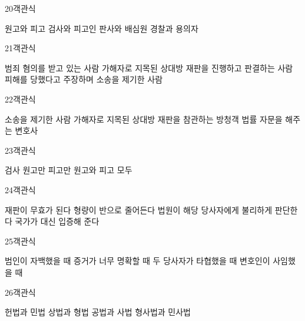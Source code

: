 \documentclass[fs9,seriesRus]{korfarm-base}
\begin{document}
\begin{kfQBlock}{20}{객관식}
\begin{kfChoices}
\kfChoice 원고와 피고
\kfChoice 검사와 피고인
\kfChoice 판사와 배심원
\kfChoice 경찰과 용의자
\end{kfChoices}
\end{kfQBlock}
\begin{kfQBlock}{21}{객관식}
\begin{kfChoices}
\kfChoice 범죄 혐의를 받고 있는 사람
\kfChoice 가해자로 지목된 상대방
\kfChoice 재판을 진행하고 판결하는 사람
\kfChoice 피해를 당했다고 주장하며 소송을 제기한 사람
\end{kfChoices}
\end{kfQBlock}
\begin{kfQBlock}{22}{객관식}
\begin{kfChoices}
\kfChoice 소송을 제기한 사람
\kfChoice 가해자로 지목된 상대방
\kfChoice 재판을 참관하는 방청객
\kfChoice 법률 자문을 해주는 변호사
\end{kfChoices}
\end{kfQBlock}
\begin{kfQBlock}{23}{객관식}
\begin{kfChoices}
\kfChoice 검사
\kfChoice 원고만
\kfChoice 피고만
\kfChoice 원고와 피고 모두
\end{kfChoices}
\end{kfQBlock}
\begin{kfQBlock}{24}{객관식}
\begin{kfChoices}
\kfChoice 재판이 무효가 된다
\kfChoice 형량이 반으로 줄어든다
\kfChoice 법원이 해당 당사자에게 불리하게 판단한다
\kfChoice 국가가 대신 입증해 준다
\end{kfChoices}
\end{kfQBlock}
\begin{kfQBlock}{25}{객관식}
\begin{kfChoices}
\kfChoice 범인이 자백했을 때
\kfChoice 증거가 너무 명확할 때
\kfChoice 두 당사자가 타협했을 때
\kfChoice 변호인이 사임했을 때
\end{kfChoices}
\end{kfQBlock}
\begin{kfQBlock}{26}{객관식}
\begin{kfChoices}
\kfChoice 헌법과 민법
\kfChoice 상법과 형법
\kfChoice 공법과 사법
\kfChoice 형사법과 민사법
\end{kfChoices}
\end{kfQBlock}
\end{document}
